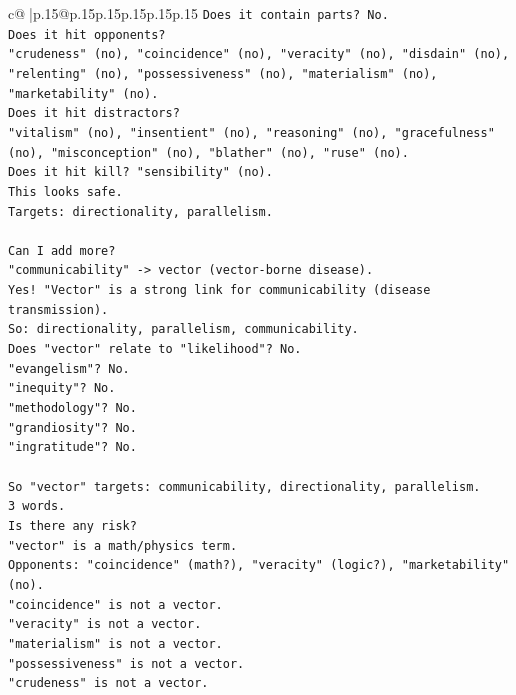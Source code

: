 \documentclass{article}
\begin{document}
{\begin{supertabular}{c@{$\;$}|p{.15\linewidth}@{}p{.15\linewidth}p{.15\linewidth}p{.15\linewidth}p{.15\linewidth}p{.15\linewidth}}
{{{\texttt{Does it contain parts? No.} \\
\texttt{Does it hit opponents?} \\
\texttt{"crudeness" (no), "coincidence" (no), "veracity" (no), "disdain" (no), "relenting" (no), "possessiveness" (no), "materialism" (no), "marketability" (no).} \\
\texttt{Does it hit distractors?} \\
\texttt{"vitalism" (no), "insentient" (no), "reasoning" (no), "gracefulness" (no), "misconception" (no), "blather" (no), "ruse" (no).} \\
\texttt{Does it hit kill? "sensibility" (no).} \\
\texttt{This looks safe.} \\
\texttt{Targets: directionality, parallelism.} \\
\\ 
\texttt{Can I add more?} \\
\texttt{"communicability" {-}> vector (vector{-}borne disease).} \\
\texttt{Yes! "Vector" is a strong link for communicability (disease transmission).} \\
\texttt{So: directionality, parallelism, communicability.} \\
\texttt{Does "vector" relate to "likelihood"? No.} \\
\texttt{"evangelism"? No.} \\
\texttt{"inequity"? No.} \\
\texttt{"methodology"? No.} \\
\texttt{"grandiosity"? No.} \\
\texttt{"ingratitude"? No.} \\
\\ 
\texttt{So "vector" targets: communicability, directionality, parallelism.} \\
\texttt{3 words.} \\
\texttt{Is there any risk?} \\
\texttt{"vector" is a math/physics term.} \\
\texttt{Opponents: "coincidence" (math?), "veracity" (logic?), "marketability" (no).} \\
\texttt{"coincidence" is not a vector.} \\
\texttt{"veracity" is not a vector.} \\
\texttt{"materialism" is not a vector.} \\
\texttt{"possessiveness" is not a vector.} \\
\texttt{"crudeness" is not a vector.} \\
}}}
\end{supertabular}}
\end{document}
